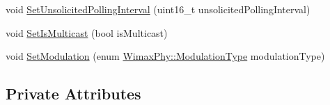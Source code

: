 \begin{DoxyCompactItemize}
\item 
void \hyperlink{classns3_1_1ServiceFlow_ad365ab6833fa3fd889946b4022cc4427}{Set\+Unsolicited\+Polling\+Interval} (uint16\+\_\+t unsolicited\+Polling\+Interval)
\item 
void \hyperlink{classns3_1_1ServiceFlow_ab183b35d211a3ebdbdddecfbe2c815fc}{Set\+Is\+Multicast} (bool is\+Multicast)
\item 
void \hyperlink{classns3_1_1ServiceFlow_a5e235779577b794796ec2cf1d8fd4aa0}{Set\+Modulation} (enum \hyperlink{classns3_1_1WimaxPhy_a044c5d8a48ca992c39c2a946f6e755fa}{Wimax\+Phy\+::\+Modulation\+Type} modulation\+Type)
\end{DoxyCompactItemize}
\subsection*{Private Attributes}
